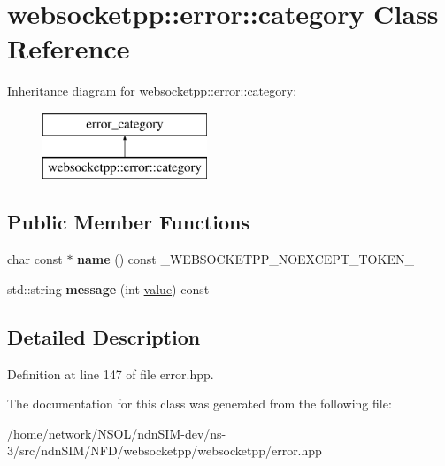 \hypertarget{classwebsocketpp_1_1error_1_1category}{}\section{websocketpp\+:\+:error\+:\+:category Class Reference}
\label{classwebsocketpp_1_1error_1_1category}
Inheritance diagram for websocketpp\+:\+:error\+:\+:category\+:\begin{figure}[H]
\begin{center}
\leavevmode
\includegraphics[height=2.000000cm]{classwebsocketpp_1_1error_1_1category}
\end{center}
\end{figure}
\subsection*{Public Member Functions}
\begin{DoxyCompactItemize}
\item 
char const  $\ast$ {\bfseries name} () const \+\_\+\+W\+E\+B\+S\+O\+C\+K\+E\+T\+P\+P\+\_\+\+N\+O\+E\+X\+C\+E\+P\+T\+\_\+\+T\+O\+K\+E\+N\+\_\+\hypertarget{classwebsocketpp_1_1error_1_1category_a3643effd7e637693fa04394d43c04621}{}\label{classwebsocketpp_1_1error_1_1category_a3643effd7e637693fa04394d43c04621}

\item 
std\+::string {\bfseries message} (int \hyperlink{namespacewebsocketpp_1_1error_a0558d884e44e79146ad4947aea63f68d}{value}) const\hypertarget{classwebsocketpp_1_1error_1_1category_a92dff0e7645808ef0607f9f4fa07acbb}{}\label{classwebsocketpp_1_1error_1_1category_a92dff0e7645808ef0607f9f4fa07acbb}

\end{DoxyCompactItemize}


\subsection{Detailed Description}


Definition at line 147 of file error.\+hpp.



The documentation for this class was generated from the following file\+:\begin{DoxyCompactItemize}
\item 
/home/network/\+N\+S\+O\+L/ndn\+S\+I\+M-\/dev/ns-\/3/src/ndn\+S\+I\+M/\+N\+F\+D/websocketpp/websocketpp/error.\+hpp\end{DoxyCompactItemize}
